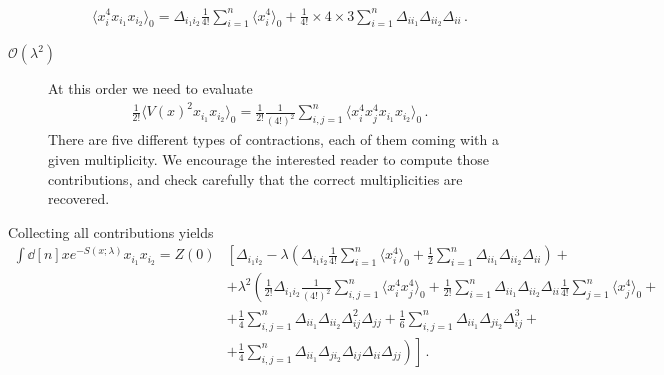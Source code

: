\documentclass[notes.tex]{subfiles}
\begin{document}
\begin{description}
\begin{align}
    \langle x_i^4 x_{i_1} x_{i_2} \rangle_0 = 
    \Delta_{i_1 i_2} \frac{1}{4!} \sum_{i=1}^n \langle x_i^4\rangle_0
    + \frac{1}{4!} \times 4 \times 3 \sum_{i=1}^n \Delta_{i i_1}
    \Delta_{i i_2} \Delta_{i i} \, .
  \end{align}
\item[$\mathcal{O}(\lambda^2)$] At this order we need to evaluate
  \begin{align}
    \frac{1}{2!} \langle V(x)^2 x_{i_1} x_{i_2} \rangle_0 = 
    \frac{1}{2!} \frac{1}{(4!)^2} \sum_{i,j=1}^n \langle x_i^4 x_j^4
    x_{i_1} x_{i_2} \rangle_0\, .
  \end{align}
  There are five different types of contractions, each of them coming
  with a given multiplicity. We encourage the interested reader to
  compute those contributions, and check carefully that the correct
  multiplicities are recovered. 
\end{description}
Collecting all contributions yields
\begin{align}
  \int \dd[n]{x} e^{-S(x;\lambda)} 
  x_{i_1} x_{i_2} = Z(0) & 
                           \left[
                           \Delta_{i_1 i_2} - \lambda \left(\Delta_{i_1 i_2}
                           \frac{1}{4!} \sum_{i=1}^n \langle
                           x_i^4\rangle_0 +  \frac12 \sum_{i=1}^n
                           \Delta_{i i_1} \Delta_{i i_2} \Delta_{i i} 
                           \right) + \right. \nonumber \\
                         & \left.
                           + \lambda^2 \left( 
                           \frac{1}{2!} \Delta_{i_1 i_2} \frac{1}{(4!)^2}
                           \sum_{i,j=1}^n \langle x_i^4 x_j^4 \rangle_0
                           + \frac{1}{2!} \sum_{i=1}^n \Delta_{i i_1}
                           \Delta_{i i_2} \Delta_{i i}  \frac{1}{4!}
                           \sum_{j=1}^n \langle x_j^4 \rangle_0
                           + \right. \right. \nonumber \\
                         & + \left. \left.
                           \frac{1}{4} \sum_{i,j=1}^n \Delta_{i i_1}
                           \Delta_{i i_2} \Delta_{i j}^2 \Delta_{jj}
                           + \frac{1}{6} \sum_{i,j=1}^n \Delta_{i i_1}
                           \Delta_{j i_2} \Delta_{i j}^3 +
                           \right. \right. \nonumber \\
  \label{eq:TwoPointNotNorm}
                         & + \left. \left.
                           \frac{1}{4} \sum_{i,j=1}^n \Delta_{i i_1}
                           \Delta_{j i_2} \Delta_{i j} \Delta_{ii}\Delta_{jj}
                           \right)
                           \right]\, .
\end{align}
\end{document}
